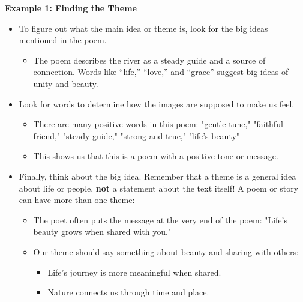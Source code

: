 \documentclass[12pt]{article}
\begin{document}
\vspace{1em}

\begin{tcolorbox}[colframe=black!60, colback=white, 
coltitle=black, colbacktitle=black!15, fonttitle=\bfseries\Large, 
title=Examples, halign title=center, left=10pt, right=10pt, top=10pt, bottom=15pt]

\textbf{Example 1: Finding the Theme}  
\begin{itemize}
    \item To figure out what the main idea or theme is, look for the big ideas mentioned in the poem.
    \begin{itemize}
        \item The poem describes the river as a steady guide and a source of connection. Words like “life,” “love,” and “grace” suggest big ideas of unity and beauty.
    \end{itemize}
    \item Look for words to determine how the images are supposed to make us feel.
    \begin{itemize}
        \item There are many positive words in this poem: "gentle tune," "faithful friend," "steady guide," "strong and true," "life's beauty"
        \item This shows us that this is a poem with a positive tone or message.
    \end{itemize}
    \item Finally, think about the big idea. Remember that a theme is a general idea about life or people, \textbf{not} a statement about the text itself! A poem or story can have more than one theme:
    \begin{itemize}
        \item The poet often puts the message at the very end of the poem: "Life's beauty grows when shared with you."
        \item Our theme should say something about beauty and sharing with others:
        \begin{itemize}
            \item Life’s journey is more meaningful when shared.
            \item Nature connects us through time and place.
        \end{itemize}
    \end{itemize}


\end{itemize}




\end{tcolorbox}
\end{document}
